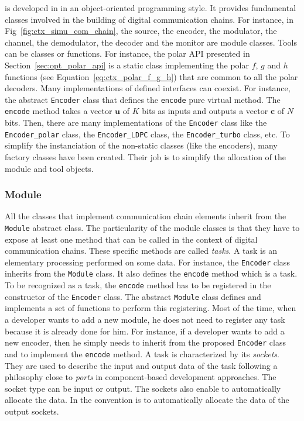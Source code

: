 \AFFECT is developed in \Cxx in an object-oriented programming style. It
provides fundamental classes involved in the building of digital communication
chains. For instance, in Fig~\ref{fig:ctx_simu_com_chain}, the source, the
encoder, the modulator, the channel, the demodulator, the decoder and the
monitor are module classes. Tools can be classes or functions. For instance, the
polar API presented in Section~\ref{sec:opt_polar_api} is a static class
implementing the polar $f$, $g$ and $h$ functions (see
Equation~\ref{eq:ctx_polar_f_g_h}) that are common to all the polar decoders.
Many implementations of defined interfaces can coexist. For instance, the
abstract \verb|Encoder| class that defines the \verb|encode| pure virtual
method. The \verb|encode| method takes a vector $\bm{u}$ of $K$ bits as inputs
and outputs a vector $\bm{c}$ of $N$ bits. Then, there are many implementations
of the \verb|Encoder| class like the \verb|Encoder_polar| class, the
\verb|Encoder_LDPC| class, the \verb|Encoder_turbo| class, etc. To simplify the
instanciation of the non-static classes (like the encoders), many factory
classes have been created. Their job is to simplify the allocation of the module
and tool objects.

\subsubsection{Module}

All the classes that implement communication chain elements inherit from the
\verb|Module| abstract class. The particularity of the module classes is that
they have to expose at least one method that can be called in the context of
digital communication chains. These specific methods are called \emph{tasks}.
A task is an elementary processing performed on some data. For instance, the
\verb|Encoder| class inherits from the \verb|Module| class. It also defines the
\verb|encode| method which is a task. To be recognized as a task, the
\verb|encode| method has to be registered in the constructor of the
\verb|Encoder| class. The abstract \verb|Module| class defines and implements a
set of functions to perform this registering. Most of the time, when a developer
wants to add a new module, he does not need to register any task because it is
already done for him. For instance, if a developer wants to add a new encoder,
then he simply needs to inherit from the proposed \verb|Encoder| class and to
implement the \verb|encode| method. A task is characterized by its
\emph{sockets}. They are used to describe the input and output data of the task
following a philosophy close to \emph{ports} in component-based development
approaches. The socket type can be input or output. The sockets also enable to
automatically allocate the data. In \AFFECT the convention is to automatically
allocate the data of the output sockets.

